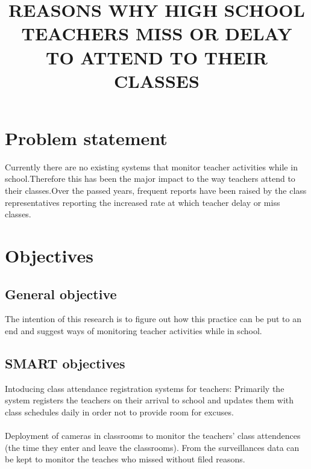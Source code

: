 \documentclass[12pt]{article}
\title{\textbf{REASONS WHY HIGH SCHOOL TEACHERS MISS OR DELAY TO ATTEND TO THEIR CLASSES}}
\date{}
\begin{document}
\maketitle

\section{Problem statement}
Currently there are no existing systems that monitor teacher activities while in school.Therefore this has been the major impact to the way teachers attend to their classes.Over the passed years, frequent reports have been raised by the class representatives reporting the increased rate at which teacher delay or miss classes. 

\section{Objectives}

\subsection{General objective}
The intention of this research is to figure out  how this practice can be put to an end and suggest ways of monitoring teacher activities while in school.
\subsection{SMART objectives}
Intoducing class attendance registration systems for teachers: Primarily the system registers the teachers on their arrival to school and updates them with class schedules daily in order not to provide room for excuses.\\
\\Deployment of cameras in classrooms to monitor the teachers' class attendences (the time they enter and leave the classrooms). From the surveillances data can be kept to monitor the teaches who missed without filed reasons. 
\end{document}
